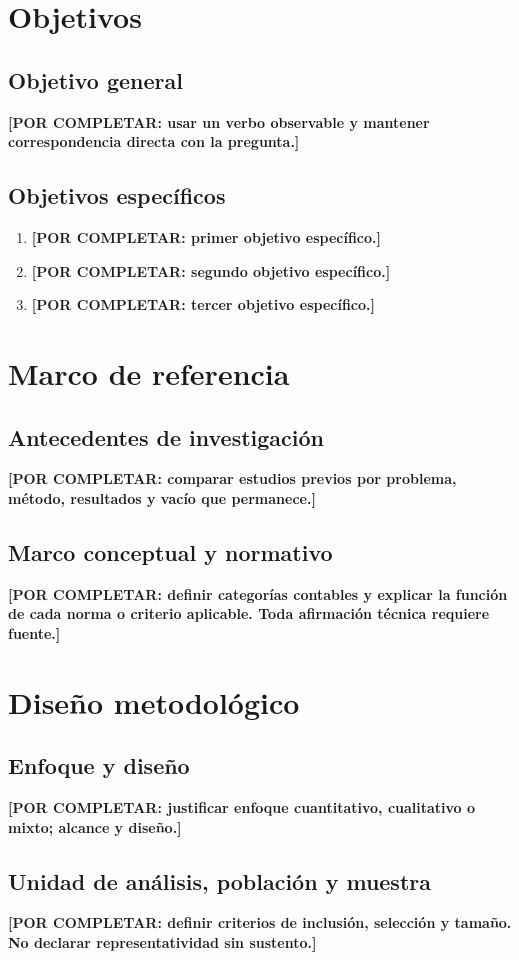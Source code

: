 \documentclass[spanish,letterpaper,oneside]{article}
\newcommand{\porcompletar}[1]{\textcolor{uasBlue}{\textbf{[POR COMPLETAR: #1]}}}
\begin{document}
\section{Objetivos}
\subsection{Objetivo general}
\porcompletar{usar un verbo observable y mantener correspondencia directa con la pregunta.}

\subsection{Objetivos específicos}
\begin{enumerate}
  \item \porcompletar{primer objetivo específico.}
  \item \porcompletar{segundo objetivo específico.}
  \item \porcompletar{tercer objetivo específico.}
\end{enumerate}

\section{Marco de referencia}
\subsection{Antecedentes de investigación}
\porcompletar{comparar estudios previos por problema, método, resultados y vacío que permanece.}

\subsection{Marco conceptual y normativo}
\porcompletar{definir categorías contables y explicar la función de cada norma o criterio aplicable. Toda afirmación técnica requiere fuente.}

\section{Diseño metodológico}
\subsection{Enfoque y diseño}
\porcompletar{justificar enfoque cuantitativo, cualitativo o mixto; alcance y diseño.}

\subsection{Unidad de análisis, población y muestra}
\porcompletar{definir criterios de inclusión, selección y tamaño. No declarar representatividad sin sustento.}
\end{document}
